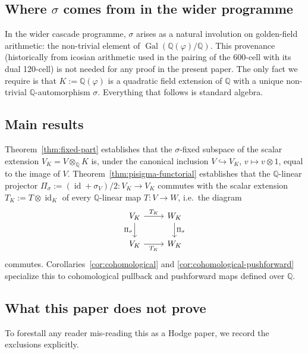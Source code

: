 \documentclass[11pt, a4paper]{amsart}
\theoremstyle{definition}
\newcommand{\Q}{\mathbb{Q}}
\newcommand{\id}{\operatorname{id}}
\begin{document}
\subsection{Where $\sigma$ comes from in the wider programme}

In the wider cascade programme, $\sigma$ arises as a natural
involution on golden-field arithmetic: the non-trivial element of
$\operatorname{Gal}(\Q(\varphi)/\Q)$. This provenance (historically
from icosian arithmetic used in the pairing of the 600-cell with
its dual 120-cell) is not needed for any proof in the present
paper. The only fact we require is that $K := \Q(\varphi)$ is a
quadratic field extension of $\Q$ with a unique non-trivial
$\Q$-automorphism $\sigma$. Everything that follows is standard
algebra.

\subsection{Main results}

Theorem~\ref{thm:fixed-part} establishes that the $\sigma$-fixed
subspace of the scalar extension $V_K = V \otimes_\Q K$ is, under
the canonical inclusion $V \hookrightarrow V_K$, $v \mapsto
v \otimes 1$, equal to the image of $V$. Theorem~\ref{thm:pisigma-functorial}
establishes that the $\Q$-linear projector
$\Pi_\sigma := (\id + \sigma_V)/2 \colon V_K \to V_K$ commutes with
the scalar extension $T_K := T \otimes \id_K$ of every $\Q$-linear
map $T \colon V \to W$, i.e.\ the diagram
\[
\begin{tikzcd}
  V_K \arrow[r, "T_K"] \arrow[d, "\Pi_\sigma"'] & W_K \arrow[d, "\Pi_\sigma"] \\
  V_K \arrow[r, "T_K"'] & W_K
\end{tikzcd}
\]
commutes. Corollaries~\ref{cor:cohomological} and
\ref{cor:cohomological-pushforward} specialize this to
cohomological pullback and pushforward maps defined over $\Q$.

\subsection{What this paper does not prove}
\label{subsec:does-not-prove}

To forestall any reader mis-reading this as a Hodge paper, we
record the exclusions explicitly.
\end{document}
